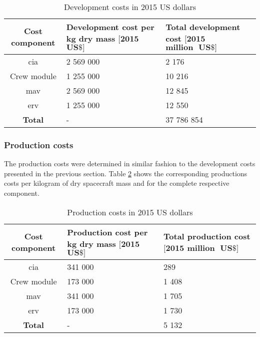 \begin{table}
	\centering
	\caption{Development costs in 2015 US dollars}
	\begin{tabular}{|c|p{5cm}|p{5cm}|}
		\hline
		\textbf{Cost component} & \textbf{Development cost per kg dry mass $\mathbf{[2015}$ $\mathbf{US\$]}$} & \textbf{Total development cost $\mathbf{[2015}$ $\mathbf{million \mbox{ } US\$]}$} \\ \hline \hline
		\gls{cia} & 2 569 000 & 2 176 \\
		Crew module & 1 255 000 & 10 216 \\
		\acrlong{mav} & 2 569 000 & 12 845  \\
		\acrlong{erv} & 1 255 000 & 12 550  \\ \hline
		\textbf{Total} & - & 37 786 854 \\
		\hline
	\end{tabular}
	\label{tab:devcosts}
\vspace{-2mm}
\end{table}

\subsubsection{Production costs}
The production costs were determined in similar fashion to the development costs presented in the previous section. Table \ref{tab:productioncosts} shows the corresponding productions costs per kilogram of dry spacecraft mass and for the complete respective component.

\begin{table}[h]
	\centering
	\caption{Production costs in 2015 US dollars}
	\begin{tabular}{|c|p{5cm}|p{5cm}|}
		\hline
		\textbf{Cost component} & \textbf{Production cost per kg dry mass $\mathbf{[2015}$ $\mathbf{US\$]}$} & \textbf{Total production cost $\mathbf{[2015}$ $\mathbf{million \mbox{ } US\$]}$} \\
		\hline \hline
		\gls{cia} & 341 000 & 289 \\
		Crew module & 173 000 & 1 408 \\ 
		\acrlong{mav} & 341 000 & 1 705 \\
		\acrlong{erv} & 173 000 & 1 730 \\ \hline
		\textbf{Total} & - & 5 132 \\
		\hline
	\end{tabular}
	\label{tab:productioncosts}
\vspace{-2mm}
\end{table}

